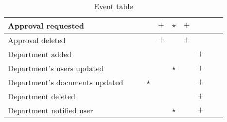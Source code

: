 \begin{table}[H]
\begin{center}
\begin{tabular}{|l|c|c|c|c|c|c|c|c|c|}
			\hline
			Approval requested &  &  &  & $+$ & $\star$ & $+$ &  &  & \\
			\hline
			Approval deleted &  &  &  & $+$ &  & $+$ &  &  & \\
			\hline
			Department added  &  &  &  &  &  &  & $+$ &  & \\
			\hline 
			Department's users updated &  &  &  &  & $\star$ &  & $+$ &  & \\
			\hline 
			Department's documents updated &  &  & $\star$ &  &  &  & $+$ &  & \\
			\hline 
			Department deleted &  &  &  &  &  &  & $+$ &  & \\
			\hline 
			Department notified user &  &  &  &  & $\star$ &  & $+$ &  & \\
			\hline
		\end{tabular}
	\end{center}
	\caption{Event table}\label{fig:eventtable}
\end{table}